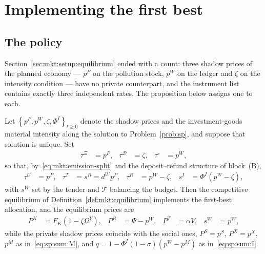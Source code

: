\section{Implementing the first best}\label{sec:mkt:implementation}

\subsection{The policy}\label{sec:mkt:implementation:policy}

Section~\ref{sec:mkt:setup:equilibrium} ended with a count: three shadow prices of the planned economy
--- $p^P$ on the pollution stock, $p^W$ on the ledger and $\zeta$ on the intensity condition --- have
no private counterpart, and the instrument list contains exactly three independent rates. The
proposition below assigns one to each.

\begin{proposition}\label{prop:mkt:implementation}
Let $\left\{p^P,p^W,\zeta,\Phi^I\right\}_{t\ge0}$ denote the shadow prices and the investment-goods
material intensity along the solution to Problem~\ref{prob:sp}, and suppose that solution is unique.
Set
\begin{align}
\tau^{\Xi} &= p^P,
&
\tau^{\mathcal D} &= \zeta,
&
\tau^{\circ} &= p^W,
\label{eq:mkt:implement-primitives}
\end{align}
so that, by~\eqref{eq:mkt:emission-split} and the deposit--refund structure of block~(B),
\begin{align}
\tau^U &= p^P,
&
\tau^T &= s^R = d^Wp^P,
&
\tau^R &= p^W-\zeta,
&
s^I &= \Phi^I\left(p^W-\zeta\right),
\label{eq:mkt:implement-derived}
\end{align}
with $s^W$ set by the tender and $\mathcal T$ balancing the budget. Then the competitive equilibrium of
Definition~\ref{def:mkt:equilibrium} implements the first-best allocation, and the equilibrium prices
are
\begin{align}
P^K &= F_K\left(1-\zeta\Omega^Y\right),
&
P^R &= \Psi-p^W,
&
P^T &= \alpha V,
&
s^W &= p^W,
\label{eq:mkt:implement-prices}
\end{align}
while the private shadow prices coincide with the social ones, $P^S=p^S$, $P^X=p^X$, $p^M$ as
in~\eqref{eq:sp:sum:M}, and $q=1-\Phi^I\left(1-\sigma\right)\left(p^W-p^M\right)$ as
in~\eqref{eq:sp:sum:I}.
\end{proposition}

